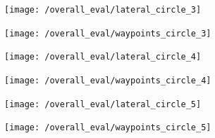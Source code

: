 \documentclass[titlepage,draft]{article}
\begin{document}
{\begin{figure}[H]
	\centering
	\begin{minipage}{.45\textwidth}
		\centering
		\texttt{[image: /overall\_eval/lateral\_circle\_3]}
		\label{fig:circle_lat_3}
	\end{minipage}%
	\hspace{0.1\textwidth}%
	\begin{minipage}{.45\textwidth}
		\centering
		\texttt{[image: /overall\_eval/waypoints\_circle\_3]}
		\label{fig:circle_way_3}
	\end{minipage}
\end{figure}

\begin{figure}[H]
	\centering
	\begin{minipage}{.45\textwidth}
		\centering
		\texttt{[image: /overall\_eval/lateral\_circle\_4]}
		\label{fig:circle_lat_4}
	\end{minipage}%
	\hspace{0.1\textwidth}%
	\begin{minipage}{.45\textwidth}
		\centering
		\texttt{[image: /overall\_eval/waypoints\_circle\_4]}
		\label{fig:circle_way_4}
	\end{minipage}
\end{figure}

\begin{figure}[H]
	\centering
	\begin{minipage}{.45\textwidth}
		\centering
		\texttt{[image: /overall\_eval/lateral\_circle\_5]}
		\label{fig:circle_lat_5}
	\end{minipage}%
	\hspace{0.1\textwidth}%
	\begin{minipage}{.45\textwidth}
		\centering
		\texttt{[image: /overall\_eval/waypoints\_circle\_5]}
		\label{fig:circle_way_5}
	\end{minipage}
\end{figure}








}
\end{document}
